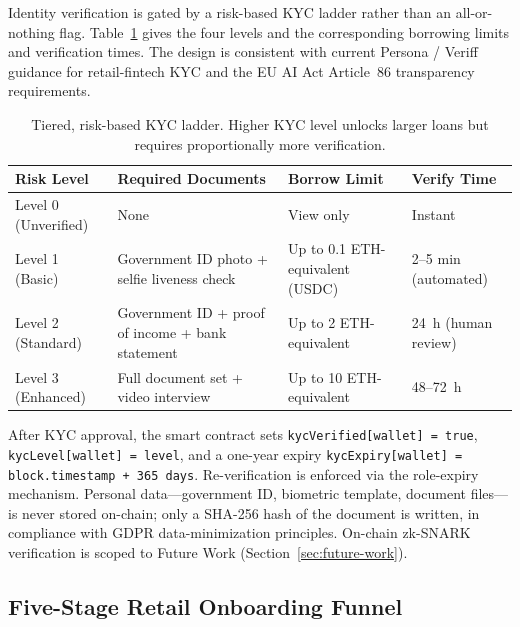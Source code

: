 \documentclass[12pt,a4paper]{report}
\newcommand{\tableheadcolor}{\rowcolor{TableHeadBg}}
\begin{document}
Identity verification is gated by a risk-based KYC ladder rather than an all-or-nothing flag. Table~\ref{tab:tiered-kyc} gives the four levels and the corresponding borrowing limits and verification times. The design is consistent with current Persona / Veriff guidance for retail-fintech KYC and the EU AI Act Article~86 transparency requirements.

\begin{table}[H]
\centering
\caption[Tiered, risk-based KYC ladder]{Tiered, risk-based KYC ladder. Higher KYC level unlocks larger loans but requires proportionally more verification.}
\label{tab:tiered-kyc}
\begin{tabular}{p{2.2cm}p{5.8cm}p{2.8cm}p{2.6cm}}
\toprule
\tableheadcolor
\textbf{Risk Level} & \textbf{Required Documents} & \textbf{Borrow Limit} & \textbf{Verify Time} \\
\midrule
Level 0 (Unverified) & None & View only & Instant \\
Level 1 (Basic) & Government ID photo + selfie liveness check & Up to 0.1 ETH-equivalent (USDC) & 2--5 min (automated) \\
Level 2 (Standard) & Government ID + proof of income + bank statement & Up to 2 ETH-equivalent & 24~h (human review) \\
Level 3 (Enhanced) & Full document set + video interview & Up to 10 ETH-equivalent & 48--72~h \\
\bottomrule
\end{tabular}
\end{table}

After KYC approval, the smart contract sets \texttt{kycVerified[wallet] = true}, \texttt{kycLevel[wallet] = level}, and a one-year expiry \texttt{kycExpiry[wallet] = block.timestamp + 365 days}. Re-verification is enforced via the role-expiry mechanism. Personal data---government ID, biometric template, document files---is never stored on-chain; only a SHA-256 hash of the document is written, in compliance with GDPR data-minimization principles. On-chain zk-SNARK verification is scoped to Future Work (Section~\ref{sec:future-work}).

\subsection{Five-Stage Retail Onboarding Funnel}
\label{sec:funnel}
\end{document}
